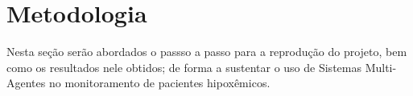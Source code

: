 \section{Metodologia} \label{sec:related}
Nesta seção serão abordados o passso a passo para a reprodução do projeto, bem como os resultados nele obtidos; de forma a sustentar o uso de Sistemas Multi-Agentes no monitoramento de pacientes hipoxêmicos.


